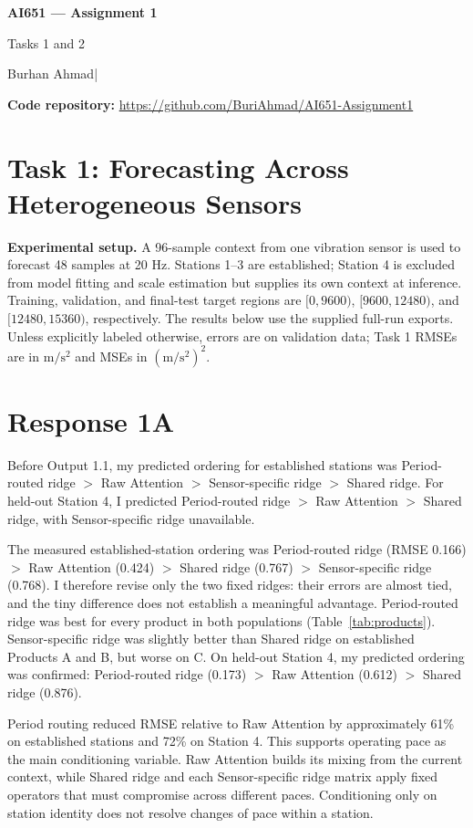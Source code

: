 \documentclass[11pt,a4paper]{article}
\newcommand{\studentname}{Burhan Ahmad}
\newcommand{\studentid}{27100405}
\newcommand{\repository}{\url{https://github.com/BuriAhmad/AI651-Assignment1}}
\newcommand{\rmseunit}{\ensuremath{\mathrm{m/s^2}}}
\newcommand{\mseunit}{\ensuremath{(\mathrm{m/s^2})^2}}
\begin{document}
\begin{center}
  {\Large\bfseries AI651 --- Assignment 1}\par
  {\large Tasks 1 and 2}\par
  \studentname\quad |\quad \studentid
\end{center}
\textbf{Code repository:} \repository

\section*{Task 1: Forecasting Across Heterogeneous Sensors}
\textbf{Experimental setup.} A 96-sample context from one vibration sensor is used to forecast 48 samples at 20 Hz. Stations 1--3 are established; Station 4 is excluded from model fitting and scale estimation but supplies its own context at inference. Training, validation, and final-test target regions are $[0,9600)$, $[9600,12480)$, and $[12480,15360)$, respectively. The results below use the supplied full-run exports. Unless explicitly labeled otherwise, errors are on validation data; Task 1 RMSEs are in \rmseunit{} and MSEs in \mseunit{}.

\section*{Response 1A}
Before Output 1.1, my predicted ordering for established stations was Period-routed ridge $>$ Raw Attention $>$ Sensor-specific ridge $>$ Shared ridge. For held-out Station 4, I predicted Period-routed ridge $>$ Raw Attention $>$ Shared ridge, with Sensor-specific ridge unavailable.

The measured established-station ordering was Period-routed ridge (RMSE 0.166) $>$ Raw Attention (0.424) $>$ Shared ridge (0.767) $>$ Sensor-specific ridge (0.768). I therefore revise only the two fixed ridges: their errors are almost tied, and the tiny difference does not establish a meaningful advantage. Period-routed ridge was best for every product in both populations (Table~\ref{tab:products}). Sensor-specific ridge was slightly better than Shared ridge on established Products A and B, but worse on C. On held-out Station 4, my predicted ordering was confirmed: Period-routed ridge (0.173) $>$ Raw Attention (0.612) $>$ Shared ridge (0.876).

Period routing reduced RMSE relative to Raw Attention by approximately 61\% on established stations and 72\% on Station 4. This supports operating pace as the main conditioning variable. Raw Attention builds its mixing from the current context, while Shared ridge and each Sensor-specific ridge matrix apply fixed operators that must compromise across different paces. Conditioning only on station identity does not resolve changes of pace within a station.
\end{document}
